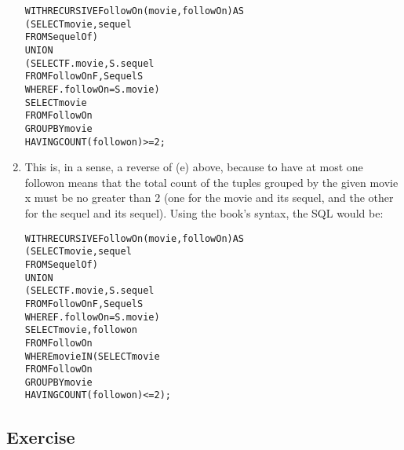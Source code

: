 \begin{enumerate}
\begin{alltt}
WITH RECURSIVE FollowOn(movie, followOn) AS
  (SELECT movie, sequel
   FROM   SequelOf     )
  UNION
  (SELECT F.movie, S.sequel
   FROM   FollowOn F, Sequel S
   WHERE  F.followOn = S.movie)
SELECT movie
FROM   FollowOn
GROUP BY movie
HAVING COUNT(followon) >= 2;
\end{alltt}
\item
This is, in a sense, a reverse of (e) above, because to have at most one
followon means that the total count of the tuples grouped by the given movie
x must be no greater than 2 (one for the movie and its sequel, and the other
for the sequel and its sequel).
Using the book's syntax, the SQL
would be:\newline
\begin{alltt}
WITH RECURSIVE FollowOn(movie, followOn) AS
  (SELECT movie, sequel
   FROM   SequelOf     )
  UNION
  (SELECT F.movie, S.sequel
   FROM   FollowOn F, Sequel S
   WHERE  F.followOn = S.movie)
SELECT movie, followon
FROM   FollowOn
WHERE  movie IN(SELECT movie
                FROM   FollowOn
                GROUP BY movie
                HAVING COUNT(followon) <= 2);
\end{alltt}
\end{enumerate}

\setcounter{subsection}{4}
\subsection*{Exercise \thesubsection}

